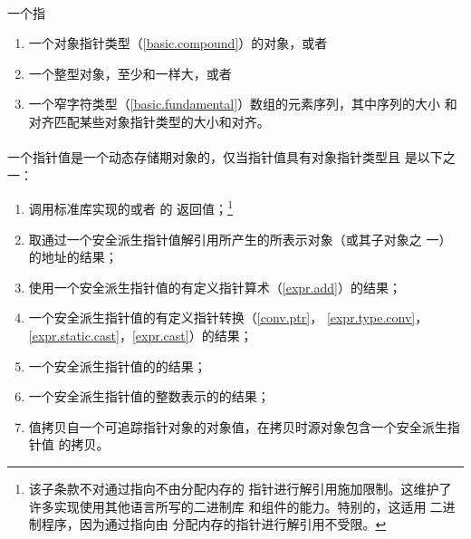 \paragraph{} %
一个指
\begin{enumerate}
  \item 一个对象指针类型（\ref{basic.compound}）的对象，或者
  \item 一个整型对象，至少和一样大，或者
  \item 一个窄字符类型（\ref{basic.fundamental}）数组的元素序列，其中序列的大小
        和对齐匹配某些对象指针类型的大小和对齐。
\end{enumerate}

\paragraph{} %
一个指针值是一个动态存储期对象的，仅当指针值具有对象指针类型且
是以下之一：
\begin{enumerate}
  \item 调用\cpp{}标准库实现的或者
        \linebreak {}的
        返回值；\footnote{该子条款不对通过指向不由分配内存的
        指针进行解引用施加限制。这维护了许多\cpp{}实现使用其他语言所写的二进制库
        和组件的能力。特别的，这适用于\c{}二进制程序，因为通过指向由
        分配内存的指针进行解引用不受限。}
  \item 取通过一个安全派生指针值解引用所产生的\lvalue{}所表示对象（或其子对象之
        一）的地址的结果；
  \item 使用一个安全派生指针值的有定义指针算术（\ref{expr.add}）的结果；
  \item 一个安全派生指针值的有定义指针转换（\ref{conv.ptr}，
        \ref{expr.type.conv}，\ref{expr.static.cast}，\ref{expr.cast}）的结果；
  \item 一个安全派生指针值的的结果；
  \item 一个安全派生指针值的整数表示的的结果；
  \item 值拷贝自一个可追踪指针对象的对象值，在拷贝时源对象包含一个安全派生指针值
        的拷贝。
\end{enumerate}

